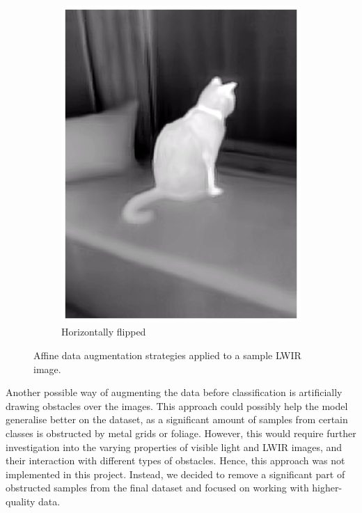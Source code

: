 \documentclass{l4proj}
\begin{document}
\begin{figure}[ht]
\begin{subfigure}[h!]{0.24\textwidth}
    \includegraphics[width=\textwidth]{images/augmentation/flipped.png}
    \caption{Horizontally flipped}
  \end{subfigure}
  \caption{Affine data augmentation strategies applied to a sample LWIR image.}
  \label{fig:augmentation_affine}
\end{figure}

Another possible way of augmenting the data before classification is artificially drawing obstacles over the images. This approach could possibly help the model generalise better on the dataset, as a significant amount of samples from certain classes is obstructed by metal grids or foliage. However, this would require further investigation into the varying properties of visible light and LWIR images, and their interaction with different types of obstacles. Hence, this approach was not implemented in this project. Instead, we decided to remove a significant part of obstructed samples from the final dataset and focused on working with higher-quality data. 
\end{document}
